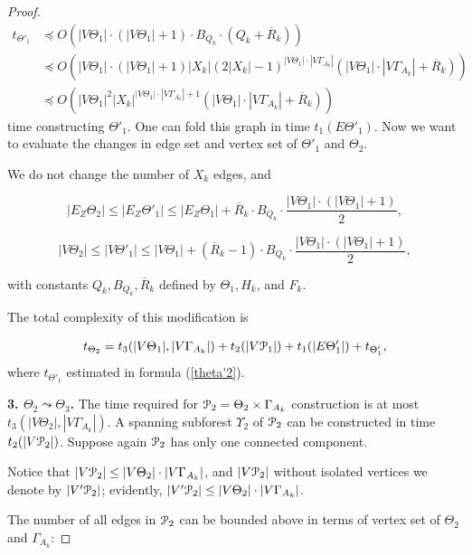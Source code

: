 \documentclass[a4paper,12pt]{article}
\newcommand{\G}{\Gamma }
\newcommand{\T}{\Theta }
\newcommand{\U}{\Upsilon }
\newcommand{\cP}{{\cal{P}}}
\numberwithin{equation}{section}
\numberwithin{figure}{section}
\begin{document}
\begin{proof}
\begin{equation}\label{theta'1}
\begin{split}
t_{\T'_1} &\preceq O(|V\T_1|\cdot(|V\T_1|+1)\cdot B_{Q_k}\cdot (
Q_k + \overline{R}_k))\\ &\preceq
O(|V\T_1|\cdot(|V\T_1|+1)|X_k|(2|X_k|-1)^{|V\T_1|\cdot |V
\G_{A_k}|}(|V \T_1|\cdot |V \G_{A_k}| + \overline{R}_k))\\
&\preceq O(|V\T_1|^2|X_k|^{|V\T_1|\cdot |V \G_{A_k}|+1}(|V
\T_1|\cdot |V \G_{A_k}| + \overline{R}_k))
\end{split}
\end{equation}
time constructing $\T'_1$. One can fold this graph in time
$t_1(E\T'_1)$. Now we want to evaluate the changes in edge set and
vertex set of $\T'_1$ and $\T_2$.


 We do not change the number of $X_k$
edges, and

\begin{equation}\label{eztheta2}
|E_Z\T_2| \le |E_Z\T'_1| \le |E_Z\T_1|+\overline{R}_k\cdot B_{Q_k}
\cdot \frac{|V\T_1|\cdot(|V\T_1|+1)}{2},
\end{equation}

\begin{equation}\label{vtheta2}
|V\T_2| \le |V \T'_1| \le |V\T_1|+(\overline{R}_k-1)\cdot B_{Q_k}
\cdot \frac{|V\T_1|\cdot(|V\T_1|+1)}{2},
\end{equation}

with constants $Q_k, B_{Q_k}, \overline{R}_k$ defined by $\T_1,
H_k$, and $F_k$.


The total complexity of this modification is

\begin{equation}\label{theta2}
t_{\T_2} = t_3(|V \T_1|, |V \G_{A_k}|) + t_2(|V\cP_1|)+
t_1(|E\T'_1|) + t_{\T'_1},
\end{equation}
where $t_{\T'_1}$ estimated in formula (\ref{theta'2}).


{\bf 3. $\T_2 \leadsto \T_3$.} The time required for
$\cP_2=\T_2\times \G_{A_k}$ construction is at most $t_3(|V \T_2|,
|V \G_{A_k}|)$. A spanning subforest $\U_2$ of $\cP_2$ can be
constructed in time $t_2(|V\cP_2|)$. Suppose again $\cP_2$ has
only one connected component.

Notice that $|V\cP_2| \le |V\T_2|\cdot |V \G_{A_k}|$, and
$|V\cP_2|$ without isolated vertices we denote by $|V'\cP_2|$;
evidently, $|V'\cP_2| \le |V\T_2|\cdot |V \G_{A_k}|$.

The number of all edges in $\cP_2$ can be bounded above in terms
of vertex set of $\T_2$ and $\G_{A_k}$:


\end{proof}
\end{document}
